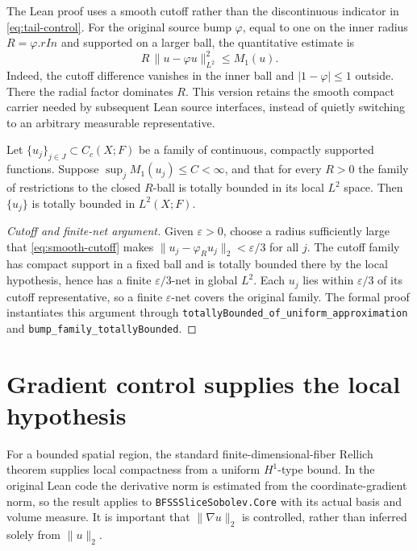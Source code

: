 The Lean proof uses a smooth cutoff rather than the discontinuous
indicator in \eqref{eq:tail-control}. For the original source bump
\(\varphi\), equal to one on the inner radius \(R=\varphi.rIn\)
and supported on a larger ball, the quantitative estimate is
\begin{equation}\label{eq:smooth-cutoff}
 R\,\|u-\varphi u\|_{L^2}^2\le M_1(u).
\end{equation}
Indeed, the cutoff difference vanishes in the inner ball and
\(|1-\varphi|\le1\) outside. There the radial factor dominates \(R\).
This version retains the smooth compact carrier needed by subsequent
Lean source interfaces, instead of quietly switching to an arbitrary
measurable representative.

\begin{theorem}\label{thm:linear-tightness}
Let \(\{u_j\}_{j\in J}\subset C_c(X;F)\) be a family of continuous,
compactly supported functions. Suppose
\(\sup_j M_1(u_j)\le C<\infty\), and that for every \(R>0\) the
family of restrictions to the closed \(R\)-ball is totally bounded in
its local \(L^2\) space. Then \(\{u_j\}\) is totally bounded in
\(L^2(X;F)\).
\end{theorem}
\begin{proof}[Cutoff and finite-net argument]
Given \(\varepsilon>0\), choose a radius sufficiently large that
\eqref{eq:smooth-cutoff} makes
\(\|u_j-\varphi_Ru_j\|_2<\varepsilon/3\) for all \(j\).
The cutoff family has compact support in a fixed ball and is totally
bounded there by the local hypothesis, hence has a finite
\(\varepsilon/3\)-net in global \(L^2\). Each \(u_j\) lies within
\(\varepsilon/3\) of its cutoff representative, so a finite
\(\varepsilon\)-net covers the original family. The formal proof
instantiates this argument through
\texttt{totallyBounded\_of\_uniform\_approximation} and
\texttt{bump\_family\_totallyBounded}.
\end{proof}

\section{Gradient control supplies the local hypothesis}
For a bounded spatial region, the standard finite-dimensional-fiber
Rellich theorem supplies local compactness from a uniform
\(H^1\)-type bound. In the original Lean code the derivative norm is
estimated from the coordinate-gradient norm, so the result applies to
\texttt{BFSSSliceSobolev.Core} with its actual basis and volume measure.
It is important that \(\|\nabla u\|_2\) is controlled, rather than
inferred solely from \(\|u\|_2\).

